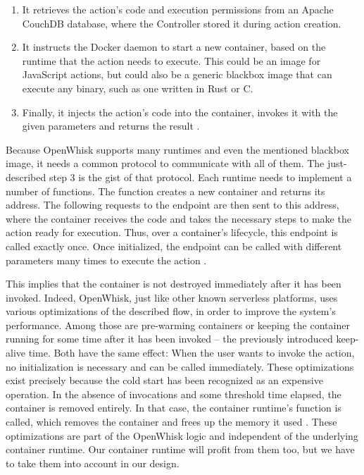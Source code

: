 \begin{enumerate}
    \item It retrieves the action's code and execution permissions from an Apache CouchDB database, where the Controller stored it during action creation.
    \item It instructs the Docker daemon to start a new container, based on the runtime that the action needs to execute. This could be an  image for JavaScript actions, but could also be a generic  blackbox image that can execute any binary, such as one written in Rust or C.
    \item Finally, it injects the action's code into the container, invokes it with the given parameters and returns the result \cite{OpenWhiskSystemDesign}.
\end{enumerate}

Because OpenWhisk supports many runtimes and even the mentioned blackbox image, it needs a common protocol to communicate with all of them. The just-described step 3 is the gist of that protocol. Each runtime needs to implement a number of functions. The  function creates a new container and returns its address. The following requests to the  endpoint are then sent to this address, where the container receives the code and takes the necessary steps to make the action ready for execution. Thus, over a container's lifecycle, this endpoint is called exactly once. Once initialized, the  endpoint can be called with different parameters many times to execute the action \cite{OpenWhiskSystemDesign}.

This implies that the container is not destroyed immediately after it has been invoked. Indeed, OpenWhisk, just like other known serverless platforms, uses various optimizations of the described flow, in order to improve the system's performance. Among those are pre-warming containers or keeping the container running for some time after it has been invoked -- the previously introduced keep-alive time. Both have the same effect: When the user wants to invoke the action, no initialization is necessary and  can be called immediately. These optimizations exist precisely because the cold start has been recognized as an expensive operation. In the absence of invocations and some threshold time elapsed, the container is removed entirely. In that case, the container runtime's  function is called, which removes the container and frees up the memory it used \cite{OpenWhiskSystemDesign}. These optimizations are part of the OpenWhisk logic and independent of the underlying container runtime. Our container runtime will profit from them too, but we have to take them into account in our design.

